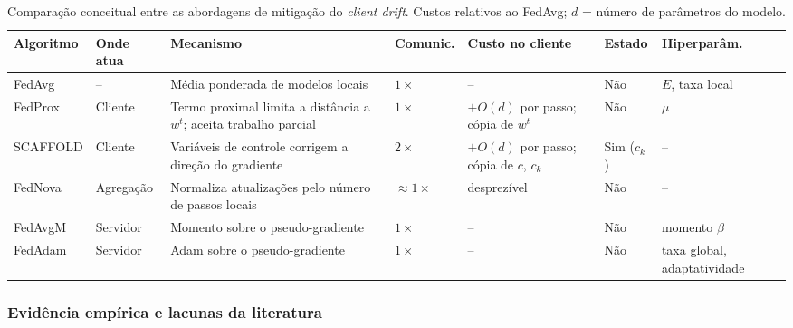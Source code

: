 \begin{table}[t]
    \centering\small
    \caption{Comparação conceitual entre as abordagens de mitigação do \textit{client drift}. Custos relativos ao FedAvg; $d$ = número de parâmetros do modelo.}
    \label{tab:abordagens}
    \setlength{\tabcolsep}{4pt}
    \begin{tabular}{@{}>{\raggedright\arraybackslash}p{2.9cm}>{\raggedright\arraybackslash}p{1.4cm}>{\raggedright\arraybackslash}p{4.6cm}>{\raggedright\arraybackslash}p{1.6cm}>{\raggedright\arraybackslash}p{2.7cm}>{\raggedright\arraybackslash}p{1.2cm}>{\raggedright\arraybackslash}p{1.9cm}@{}}
        \toprule
        Algoritmo & Onde atua & Mecanismo & Comunic. & Custo no cliente & Estado & Hiperparâm. \\
        \midrule
        FedAvg\newline \citep{mcmahan2017fedavg} & -- & Média ponderada de modelos locais & $1\times$ & -- & Não & $E$, taxa local \\
        FedProx\newline \citep{li2020fedprox} & Cliente & Termo proximal limita a distância a $w^t$; aceita trabalho parcial & $1\times$ & $+O(d)$ por passo; cópia de $w^t$ & Não & $\mu$ \\
        SCAFFOLD\newline \citep{karimireddy2020scaffold} & Cliente & Variáveis de controle corrigem a direção do gradiente & $2\times$ & $+O(d)$ por passo; cópia de $c$, $c_k$ & Sim ($c_k$) & -- \\
        FedNova\newline \citep{wang2020fednova} & Agregação & Normaliza atualizações pelo número de passos locais & $\approx 1\times$ & desprezível & Não & -- \\
        FedAvgM\newline \citep{hsu2019fedavgm} & Servidor & Momento sobre o pseudo-gradiente & $1\times$ & -- & Não & momento $\beta$ \\
        FedAdam\newline \citep{reddi2021adaptive} & Servidor & Adam sobre o pseudo-gradiente & $1\times$ & -- & Não & taxa global, adaptatividade \\
        \bottomrule
    \end{tabular}
\end{table}

\subsubsection{Evidência empírica e lacunas da literatura}

